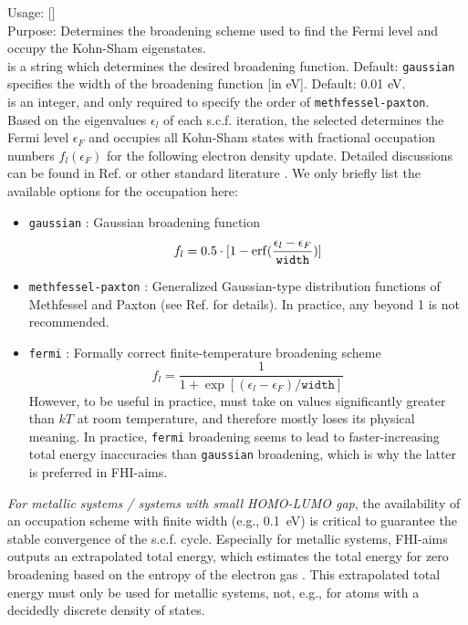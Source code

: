 {
  \noindent
  Usage:   
    [] \\[1.0ex]
  Purpose: Determines the broadening scheme used to find the Fermi
    level and occupy the Kohn-Sham eigenstates. \\[1.0ex]
   is a string which determines the desired broadening
    function. Default: \texttt{gaussian} \\
   specifies the width of the broadening function [in
    eV]. Default: 0.01 eV. \\
   is an integer, and only required to specify the order
    of  \texttt{methfessel-paxton}. \\
}
Based on the eigenvalues $\epsilon_l$ of each s.c.f. iteration, the
selected  determines the Fermi level
$\epsilon_F$ and occupies all Kohn-Sham states with fractional
occupation numbers $f_l(\epsilon_F)$ for the following electron
density update. Detailed discussions can be found in
Ref. \cite{Blum08} or other standard literature \cite{Kre96}. We only briefly list
the available options for the occupation  here:
\begin{itemize}
  \item \texttt{gaussian} : Gaussian broadening function \cite{Fu83}
    \[ 
       f_l = 0.5 \cdot [1 -
       \mathop{\mathrm{erf}}(\frac{\epsilon_l-\epsilon_F}{\mathtt{width}})] 
    \]
  \item \texttt{methfessel-paxton} : Generalized Gaussian-type
    distribution functions of Methfessel and Paxton (see Ref. \cite{Met89}
    for details). In practice, any  beyond 1 is not
    recommended. 
  \item \texttt{fermi} : Formally correct finite-temperature broadening
    scheme \cite{Mermin65}
    \[ 
       f_l = \frac{1}{1+\exp[(\epsilon_l-\epsilon_F)/\mathtt{width}]}
    \]
    However, to be useful in practice,  must take on
    values significantly greater than $kT$ at room temperature, and
    therefore mostly loses its physical meaning. In practice,
    \texttt{fermi} broadening seems to lead to faster-increasing total
    energy inaccuracies than \texttt{gaussian} broadening, which is
    why the latter is preferred in FHI-aims.
\end{itemize}
\emph{For metallic systems / systems with small HOMO-LUMO gap}, the
availability of an occupation scheme with finite width (e.g., 0.1~eV)
is critical to guarantee the stable convergence of the
s.c.f. cycle. Especially for metallic systems, FHI-aims outputs an
extrapolated total energy, which estimates the total energy for zero
broadening based on the entropy of the electron gas
\cite{Kre96,Gillan89,Wagner98}. This extrapolated total  
energy must only be used for metallic systems, not, e.g., for atoms
with a decidedly discrete density of states.

